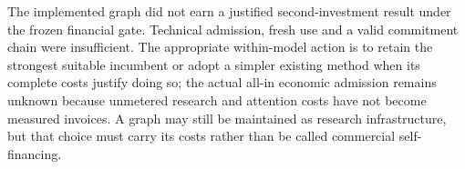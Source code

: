 The implemented graph did not earn a justified second-investment result under the frozen financial gate. Technical admission, fresh use and a valid commitment chain were insufficient. The appropriate within-model action is to retain the strongest suitable incumbent or adopt a simpler existing method when its complete costs justify doing so; the actual all-in economic admission remains unknown because unmetered research and attention costs have not become measured invoices. A graph may still be maintained as research infrastructure, but that choice must carry its costs rather than be called commercial self-financing.
